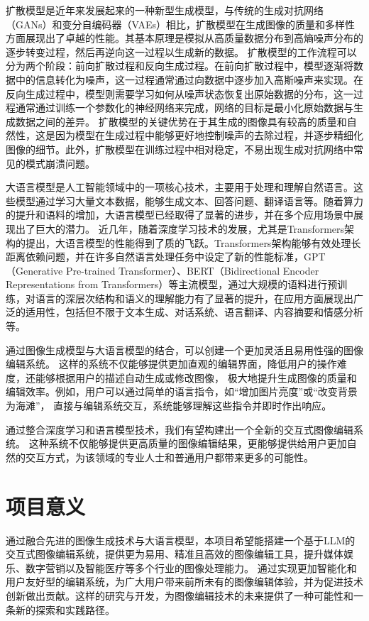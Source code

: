 \documentclass[a4paper,AutoFakeBold,oneside,12pt]{book}
\begin{document}
扩散模型是近年来发展起来的一种新型生成模型，与传统的生成对抗网络（GANs）和变分自编码器（VAEs）相比，扩散模型在生成图像的质量和多样性方面展现出了卓越的性能。其基本原理是模拟从高质量数据分布到高熵噪声分布的逐步转变过程，然后再逆向这一过程以生成新的数据。
扩散模型的工作流程可以分为两个阶段：前向扩散过程和反向生成过程。在前向扩散过程中，模型逐渐将数据中的信息转化为噪声，这一过程通常通过向数据中逐步加入高斯噪声来实现。在反向生成过程中，模型则需要学习如何从噪声状态恢复出原始数据的分布，这一过程通常通过训练一个参数化的神经网络来完成，网络的目标是最小化原始数据与生成数据之间的差异。
扩散模型的关键优势在于其生成的图像具有较高的质量和自然性，这是因为模型在生成过程中能够更好地控制噪声的去除过程，并逐步精细化图像的细节。此外，扩散模型在训练过程中相对稳定，不易出现生成对抗网络中常见的模式崩溃问题。

大语言模型是人工智能领域中的一项核心技术，主要用于处理和理解自然语言。这些模型通过学习大量文本数据，能够生成文本、回答问题、翻译语言等。随着算力的提升和语料的增加，大语言模型已经取得了显著的进步，并在多个应用场景中展现出了巨大的潜力。
近几年，随着深度学习技术的发展，尤其是Transformers架构的提出，大语言模型的性能得到了质的飞跃。Transformers架构能够有效处理长距离依赖问题，并在许多自然语言处理任务中设定了新的性能标准，GPT（Generative Pre-trained Transformer）、BERT（Bidirectional Encoder Representations from Transformers）等主流模型，通过大规模的语料进行预训练，对语言的深层次结构和语义的理解能力有了显著的提升，在应用方面展现出广泛的适用性，包括但不限于文本生成、对话系统、语言翻译、内容摘要和情感分析等。

通过图像生成模型与大语言模型的结合，可以创建一个更加灵活且易用性强的图像编辑系统。
这样的系统不仅能够提供更加直观的编辑界面，降低用户的操作难度，还能够根据用户的描述自动生成或修改图像，
极大地提升生成图像的质量和编辑效率。例如，用户可以通过简单的语言指令，如“增加图片亮度”或“改变背景为海滩”，
直接与编辑系统交互，系统能够理解这些指令并即时作出响应。

通过整合深度学习和语言模型技术，我们有望构建出一个全新的交互式图像编辑系统。
这种系统不仅能够提供更高质量的图像编辑结果，更能够提供给用户更加自然的交互方式，为该领域的专业人士和普通用户都带来更多的可能性。
\section{项目意义}
通过融合先进的图像生成技术与大语言模型，本项目希望能搭建一个基于LLM的交互式图像编辑系统，提供更为易用、精准且高效的图像编辑工具，提升媒体娱乐、数字营销以及智能医疗等多个行业的图像处理能力。
通过实现更加智能化和用户友好型的编辑系统，为广大用户带来前所未有的图像编辑体验，并为促进技术创新做出贡献。这样的研究与开发，为图像编辑技术的未来提供了一种可能性和一条新的探索和实践路径。
\end{document}

